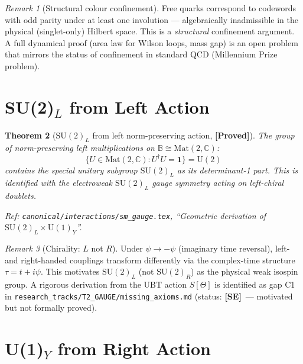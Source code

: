 \documentclass[12pt,a4paper]{article}
\newtheorem{theorem}{Theorem}[section]
\theoremstyle{definition}
\theoremstyle{remark}
\newtheorem{remark}[theorem]{Remark}
\newcommand{\PROVED}{\textbf{[Proved]}}
\newcommand{\SE}{\textbf{[SE]}}
\newcommand{\SU}[1]{\mathrm{SU}(#1)}
\newcommand{\UU}[1]{\mathrm{U}(#1)}
\begin{document}
\begin{remark}[Structural colour confinement]
Free quarks correspond to codewords with odd parity under at least one involution —
algebraically inadmissible in the physical (singlet-only) Hilbert space.  This is
a \emph{structural} confinement argument.  A full dynamical proof (area law for
Wilson loops, mass gap) is an open problem that mirrors the status of confinement
in standard QCD (Millennium Prize problem).
\end{remark}

\section{SU(2)$_L$ from Left Action}
\label{sec:su2}

\begin{theorem}[$\SU{2}_L$ from left norm-preserving action, \PROVED]
\label{thm:su2}
The group of norm-preserving left multiplications on $\mathbb{B}\cong\mathrm{Mat}(2,\mathbb{C})$:
\[
  \{U\in\mathrm{Mat}(2,\mathbb{C}) : U^\dagger U = \mathbf{1}\} = \UU{2}
\]
contains the special unitary subgroup $\SU{2}_L$ as its determinant-1 part.
This is identified with the electroweak $\SU{2}_L$ gauge symmetry acting on
left-chiral doublets.

Ref: \texttt{canonical/interactions/sm\_gauge.tex},
``Geometric derivation of $\SU{2}_L\times\UU{1}_Y$''.
\end{theorem}

\begin{remark}[Chirality: $L$ not $R$]
Under $\psi\to-\psi$ (imaginary time reversal), left- and right-handed
couplings transform differently via the complex-time structure
$\tau = t + i\psi$.  This motivates $\SU{2}_L$ (not $\SU{2}_R$) as the
physical weak isospin group.  A rigorous derivation from the UBT action $S[\Theta]$
is identified as gap C1 in \texttt{research\_tracks/T2\_GAUGE/missing\_axioms.md}
(status: \SE\ — motivated but not formally proved).
\end{remark}

\section{U(1)$_Y$ from Right Action}
\label{sec:u1}
\end{document}
